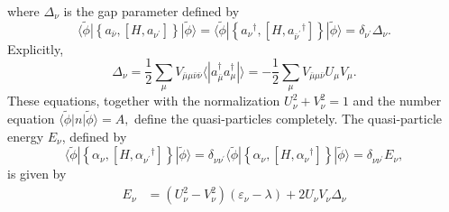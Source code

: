 where $\Delta_\nu$ is the gap parameter defined by
\begin{equation}
    \langle \tilde{\phi}|\left\{a_{\bar{\nu}},\left[H, a_{\nu^{\prime}}\right]\right\}|\tilde{\phi}\rangle=\langle \tilde{\phi}|\left\{a_\nu{ }^{\dagger},\left[H, a_{\bar{\nu}^{\prime}}{ }^{\dagger}\right]\right\}|\tilde{\phi}\rangle=\delta_{\nu^{\prime}} \Delta_\nu .
\end{equation}
Explicitly,
\begin{equation}
    \Delta_\nu=\frac{1}{2} \sum_\mu V_{\bar{\mu} \mu \bar{\nu} \bar{\nu}}\langle | a_{\bar{\mu}}^{\dagger} a_\mu^{\dagger}| \rangle=-\frac{1}{2} \sum_\mu V_{\bar{\mu} \mu \bar{\nu}} U_\mu V_\mu .
\end{equation}
These equations, together with the normalization $U_\nu^2+V_\nu^2=1$ and the number equation $
\langle \tilde{\phi}| n| \tilde{\phi}\rangle=A,$
define the quasi-particles completely. The quasi-particle energy $E_\nu$, defined by
\begin{equation}
    \langle \tilde{\phi}|\left\{\alpha_\nu,\left[H, \alpha_{\nu^{\prime}}{ }^{\dagger}\right]\right\}|\tilde{\phi}\rangle=\delta_{\nu \nu^{\prime}}\langle \tilde{\phi}|\left\{\alpha_\nu,\left[H, \alpha_\nu{ }^{\dagger}\right]\right\}|\tilde{\phi}\rangle=\delta_{\nu \nu^{\prime}} E_\nu,
\end{equation}
is given by
\begin{align}
    E_\nu & =\left(U_\nu^2-V_\nu^2\right)\left(\varepsilon_\nu-\lambda\right)+2 U_\nu V_\nu \Delta_\nu \\
\end{align}


